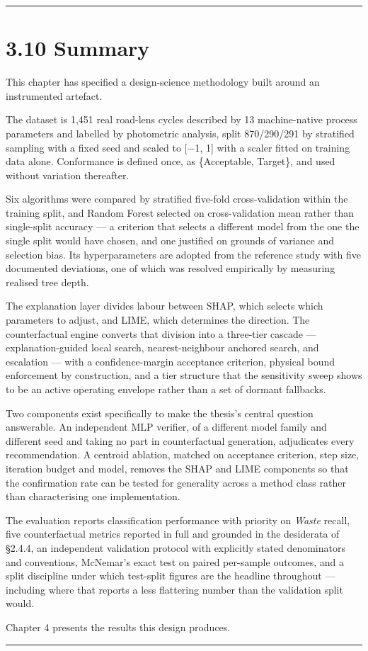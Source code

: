 \begin{center}\rule{0.5\linewidth}{0.5pt}\end{center}

\hypertarget{summary}{%
\section{3.10 Summary}\label{summary}}

This chapter has specified a design-science methodology built around an instrumented artefact.

The dataset is 1,451 real road-lens cycles described by 13 machine-native process parameters and labelled by photometric analysis, split 870/290/291 by stratified sampling with a fixed seed and scaled to {[}−1, 1{]} with a scaler fitted on training data alone. Conformance is defined once, as \{Acceptable, Target\}, and used without variation thereafter.

Six algorithms were compared by stratified five-fold cross-validation within the training split, and Random Forest selected on cross-validation mean rather than single-split accuracy --- a criterion that selects a different model from the one the single split would have chosen, and one justified on grounds of variance and selection bias. Its hyperparameters are adopted from the reference study with five documented deviations, one of which was resolved empirically by measuring realised tree depth.

The explanation layer divides labour between SHAP, which selects which parameters to adjust, and LIME, which determines the direction. The counterfactual engine converts that division into a three-tier cascade --- explanation-guided local search, nearest-neighbour anchored search, and escalation --- with a confidence-margin acceptance criterion, physical bound enforcement by construction, and a tier structure that the sensitivity sweep shows to be an active operating envelope rather than a set of dormant fallbacks.

Two components exist specifically to make the thesis's central question answerable. An independent MLP verifier, of a different model family and different seed and taking no part in counterfactual generation, adjudicates every recommendation. A centroid ablation, matched on acceptance criterion, step size, iteration budget and model, removes the SHAP and LIME components so that the confirmation rate can be tested for generality across a method class rather than characterising one implementation.

The evaluation reports classification performance with priority on \emph{Waste} recall, five counterfactual metrics reported in full and grounded in the desiderata of §2.4.4, an independent validation protocol with explicitly stated denominators and conventions, McNemar's exact test on paired per-sample outcomes, and a split discipline under which test-split figures are the headline throughout --- including where that reports a less flattering number than the validation split would.

Chapter 4 presents the results this design produces.

\begin{center}\rule{0.5\linewidth}{0.5pt}\end{center}
